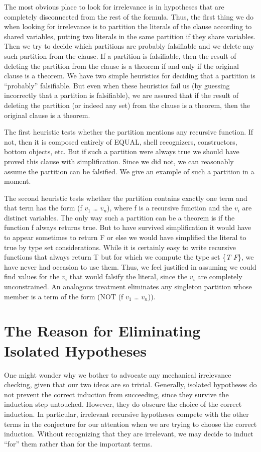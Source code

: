 \documentclass[11pt]{book}
\newcommand{\pubinlineunderline}[1]{\emph{#1}}
\newcommand{\pubdefaulttextsize}{\large}
\begin{document}
The most obvious place to look for irrelevance is
in hypotheses that are completely disconnected from the rest of
the formula.  Thus, the first thing we do when looking for
irrelevance is to partition the literals
of the clause according to shared variables, putting two literals
in the same partition if they share
variables.  Then we try to decide which partitions are probably falsifiable
and we delete any such partition from the clause.
If a partition is falsifiable, then the result
of deleting the partition from the clause is a theorem
if and only if the original clause is a theorem.
We have two simple heuristics for deciding that a partition
is ``probably'' falsifiable.  But even when these
heuristics fail us (by guessing incorrectly
that a partition is falsifiable), we are assured
that if the result of deleting the partition (or indeed any
set) from the clause is a theorem, then
the original clause is a theorem.

The first heuristic tests whether the partition mentions any recursive
function.  If not, then it is composed entirely of EQUAL, shell recognizers,
constructors, bottom objects, etc.  But if such a partition were
always true we should have proved this clause with simplification.
Since we did not, we can reasonably
assume the partition can be falsified.
We give an example of such a partition in a moment.

The second heuristic tests whether the partition contains exactly one term
and that term has the form (f $v_{1}$ \ldots{} $v_{n}$), where f is a recursive
function and the $v_{i}$ are distinct variables.
The only way such a partition can be a theorem is if the function
f always returns true.  But to have survived simplification it would
have to appear sometimes to return F or else we would have simplified
the literal to true by type set considerations.  While it is certainly
easy to write recursive functions that always return T
but for which we compute the type set \{\pubinlineunderline{T} \pubinlineunderline{F}\},
we have never had occasion to use them.
Thus, we feel justified in assuming we could find values for the $v_{i}$
that would falsify the literal, since the $v_{i}$ are completely
unconstrained.  An analogous treatment eliminates
any singleton partition whose member is a term
of the form (NOT (f $v_{1}$ \ldots{} $v_{n}$)).
\section{The Reason for Eliminating Isolated Hypotheses}
\pubdefaulttextsize
One might wonder why we bother to advocate any mechanical irrelevance
checking, given that our two ideas are so trivial.
Generally, isolated hypotheses do not prevent the correct induction from
succeeding, since they survive the induction step untouched.
However, they do obscure the choice of  the correct induction.
In particular, irrelevant recursive hypotheses
compete with the other terms in the conjecture for
our attention when we are trying to choose the correct induction.  Without recognizing
that they are irrelevant, we may decide to induct ``for'' them rather than for the important terms.
\end{document}
